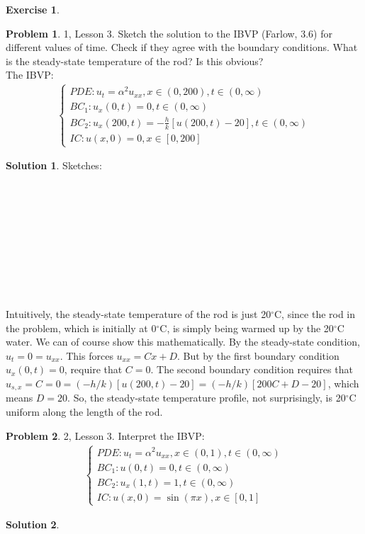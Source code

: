 \documentclass{book}
\theoremstyle{definition}
\newtheorem{sln}{Solution}[section]
\newtheorem*{prob*}{Problem}
\newtheorem*{exer*}{Exercise}
\begin{document}
\begin{exer*}
	\begin{prob*}1, Lesson 3. Sketch the solution to the IBVP (Farlow, 3.6) for different values of time. Check if they agree with the boundary conditions. What is the steady-state temperature of the rod? Is this obvious?\\
		
		The IBVP:
		\begin{align*}
		\begin{cases}
		PDE: u_t = \alpha^2 u_{xx}, x\in(0,200), t\in(0,\infty)\\
		BC_1: u_x(0,t) = 0, t\in(0,\infty)\\
		BC_2: u_x(200,t) = -\frac{h}{k}[u(200,t) - 20], t\in(0,\infty)\\
		IC: u(x,0) = 0, x\in[0,200]
		\end{cases}
		\end{align*}
		\begin{sln}
			Sketches:\\\\\\\\\\\\\\\\\\\
			
			Intuitively, the steady-state temperature of the rod is just 20$^\circ$C, since the rod in the problem, which is initially at 0$^\circ$C, is simply being warmed up by the 20$^\circ$C water. We can of course show this mathematically. By the steady-state condition, $u_t = 0 = u_{xx}$. This forces $u_{xx} = Cx + D$. But by the first boundary condition $u_x(0,t)=0$, require that $C = 0$. The second boundary condition requires that $u_{s,x} = C = 0 = (-h/k)[u(200,t) -20] = (-h/k)[200C + D - 20]$, which means $D=20$. So, the steady-state temperature profile, not surprisingly, is 20$^\circ$C uniform along the length of the rod. 
		\end{sln}
	\end{prob*}
	\newpage
	\begin{prob*}2, Lesson 3. Interpret the IBVP:
		\begin{align*}
		\begin{cases}
		PDE: u_t = \alpha^2 u_{xx}, x\in(0,1), t\in(0,\infty)\\
		BC_1: u(0,t) = 0, t\in(0,\infty)\\
		BC_2: u_x(1,t) = 1, t\in(0,\infty)\\
		IC: u(x,0) = \sin(\pi x), x\in[0,1]
		\end{cases}
		\end{align*}
		\begin{sln}
			$\,$\\
			

\end{sln}
\end{prob*}
\end{exer*}
\end{document}
